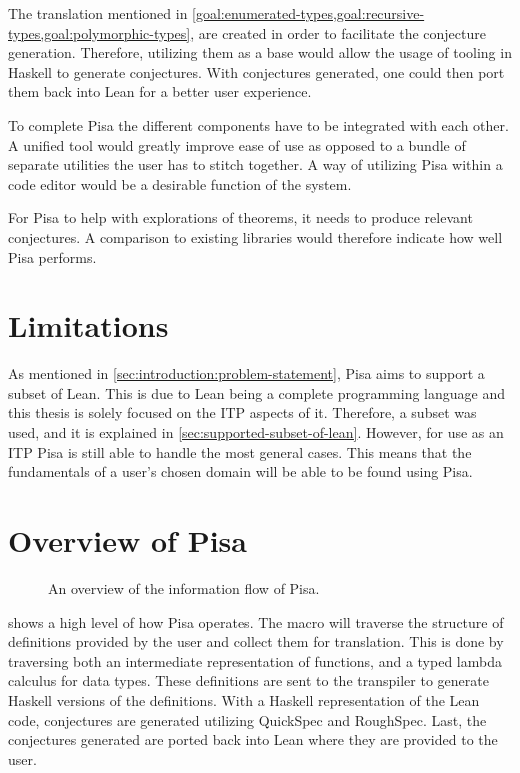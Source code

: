 \label{goal:conjecture}
The translation mentioned in \cref{goal:enumerated-types,goal:recursive-types,goal:polymorphic-types}, are created in order to facilitate the conjecture generation.
Therefore, utilizing them as a base would allow the usage of tooling in Haskell to generate conjectures.
With conjectures generated, one could then port them back into Lean for a better user experience.

\label{goal:integration}
To complete Pisa the different components have to be integrated with each other.
A unified tool would greatly improve ease of use as opposed to a bundle of separate utilities the user has to stitch together.
A way of utilizing Pisa within a code editor would be a desirable function of the system.

\label{goal:relevance}
For Pisa to help with explorations of theorems, it needs to produce relevant conjectures.
A comparison to existing libraries would therefore indicate how well Pisa performs.

\section{Limitations}\label{sec:introduction:limitations}
As mentioned in \cref{sec:introduction:problem-statement}, Pisa aims to support a subset of Lean.
This is due to Lean being a complete programming language and this thesis is solely focused on the ITP aspects of it.
Therefore, a subset was used, and it is explained in \cref{sec:supported-subset-of-lean}.
However, for use as an ITP Pisa is still able to handle the most general cases.
This means that the fundamentals of a user's chosen domain will be able to be found using Pisa.

\section{Overview of Pisa}\label{sec:introduction:overview}

\begin{figure}[H]
  \centering
  
  \caption{An overview of the information flow of Pisa.}\label{fig:intro-overview}
\end{figure}

 shows a high level of how Pisa operates.
The macro will traverse the structure of definitions provided by the user and collect them for translation.
This is done by traversing both an intermediate representation of functions, and a typed lambda calculus for data types.
These definitions are sent to the transpiler to generate Haskell versions of the definitions.
With a Haskell representation of the Lean code, conjectures are generated utilizing QuickSpec and RoughSpec.
Last, the conjectures generated are ported back into Lean where they are provided to the user.
